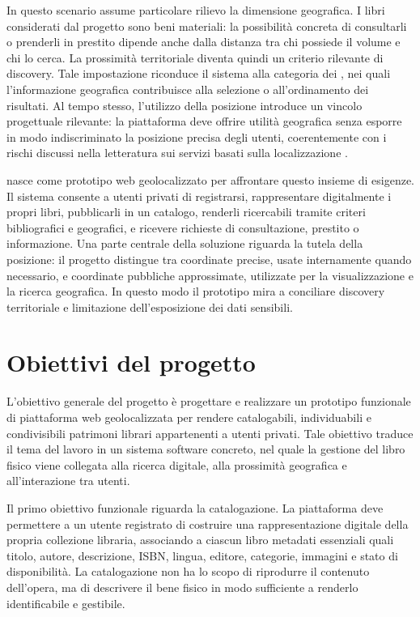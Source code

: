 In questo scenario assume particolare rilievo la dimensione geografica. I libri considerati dal progetto sono beni materiali: la possibilità concreta di consultarli o prenderli in prestito dipende anche dalla distanza tra chi possiede il volume e chi lo cerca. La prossimità territoriale diventa quindi un criterio rilevante di discovery. Tale impostazione riconduce il sistema alla categoria dei \locationbasedservices{}, nei quali l'informazione geografica contribuisce alla selezione o all'ordinamento dei risultati. Al tempo stesso, l'utilizzo della posizione introduce un vincolo progettuale rilevante: la piattaforma deve offrire utilità geografica senza esporre in modo indiscriminato la posizione precisa degli utenti, coerentemente con i rischi discussi nella letteratura sui servizi basati sulla localizzazione \cite{jiang2021locationprivacy,rasheed2024locationqueryprivacy}.

\projectname{} nasce come prototipo web geolocalizzato per affrontare questo insieme di esigenze. Il sistema consente a utenti privati di registrarsi, rappresentare digitalmente i propri libri, pubblicarli in un catalogo, renderli ricercabili tramite criteri bibliografici e geografici, e ricevere richieste di consultazione, prestito o informazione. Una parte centrale della soluzione riguarda la tutela della posizione: il progetto distingue tra coordinate precise, usate internamente quando necessario, e coordinate pubbliche approssimate, utilizzate per la visualizzazione e la ricerca geografica. In questo modo il prototipo mira a conciliare discovery territoriale e limitazione dell'esposizione dei dati sensibili.

\section{Obiettivi del progetto}
\label{sec:obiettivi-progetto}

L'obiettivo generale del progetto è progettare e realizzare un prototipo funzionale di piattaforma web geolocalizzata per rendere catalogabili, individuabili e condivisibili patrimoni librari appartenenti a utenti privati. Tale obiettivo traduce il tema del lavoro in un sistema software concreto, nel quale la gestione del libro fisico viene collegata alla ricerca digitale, alla prossimità geografica e all'interazione tra utenti.

Il primo obiettivo funzionale riguarda la catalogazione. La piattaforma deve permettere a un utente registrato di costruire una rappresentazione digitale della propria collezione libraria, associando a ciascun libro metadati essenziali quali titolo, autore, descrizione, ISBN, lingua, editore, categorie, immagini e stato di disponibilità. La catalogazione non ha lo scopo di riprodurre il contenuto dell'opera, ma di descrivere il bene fisico in modo sufficiente a renderlo identificabile e gestibile.


